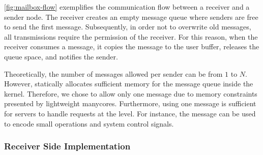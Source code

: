 

			\autoref{fig:mailbox-flow} exemplifies the communication flow between a
			receiver and a sender node. The receiver creates an empty message queue
			where senders are free to send the first message. Subsequently, in order
			not to overwrite old messages, all transmissions require the permission
			of the receiver. For this reason,  when the receiver consumes a message,
			it copies the message to the user buffer, releases the queue space, and
			notifies the sender.
			
			Theoretically, the number of messages allowed per sender can be from
			$1$ to $N$. However, \nanvix \hal statically allocates sufficient
			memory for the message queue inside the kernel. Therefore, we chose
			to allow only one message due to memory constraints presented by
			lightweight manycores. Furthermore, using one message is sufficient	for
			servers to handle requests at the \multikernel level. For instance, the
			message can be used to encode small operations and system control signals.
			
			\subsubsection{Receiver Side Implementation}


